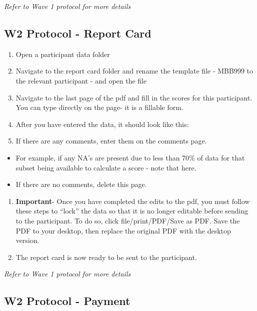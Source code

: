 \documentclass[]{book}
\begin{document}
\emph{Refer to Wave 1 protocol for more details}

\hypertarget{w2-protocol---report-card}{%
\subsection{W2 Protocol - Report Card}\label{w2-protocol---report-card}}

\begin{enumerate}
\def\labelenumi{\arabic{enumi}.}
\item
  Open a participant data folder
\item
  Navigate to the report card folder and rename the template file - MBB999 to the relevant participant - and open the file
\item
  Navigate to the last page of the pdf and fill in the scores for this participant. You can type directly on the page- it is a fillable form.
\item
  After you have entered the data, it should look like this:
\item
  If there are any comments, enter them on the comments page.
\end{enumerate}

\begin{itemize}
\item
  For example, if any NA's are present due to less than 70\% of data for that subset being available to calculate a score - note that here.
\item
  If there are no comments, delete this page.
\end{itemize}

\begin{enumerate}
\def\labelenumi{\arabic{enumi}.}
\setcounter{enumi}{5}
\item
  \textbf{Important}- Once you have completed the edits to the pdf, you must follow these steps to ``lock'' the data so that it is no longer editable before sending to the participant. To do so, click file/print/PDF/Save as PDF. Save the PDF to your desktop, then replace the original PDF with the desktop version.
\item
  The report card is now ready to be sent to the participant.
\end{enumerate}

\emph{Refer to Wave 1 protocol for more details}

\hypertarget{w2-protocol---payment-1}{%
\subsection{W2 Protocol - Payment}\label{w2-protocol---payment-1}}
\end{document}

